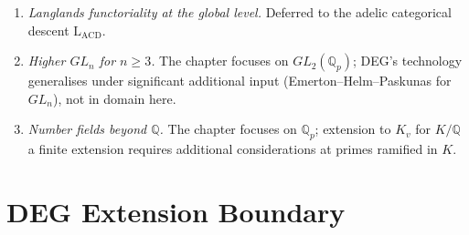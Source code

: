 \begin{enumerate}
\item \emph{Langlands functoriality at the global level.} Deferred to
the adelic categorical descent \(\mathrm{L}_{\mathrm{ACD}}\).
\item \emph{Higher \(GL_{n}\) for \(n\geq 3\).} The chapter focuses on
\(GL_{2}(\mathbb{Q}_{p})\); DEG's technology generalises under
significant additional input (Emerton--Helm--Paskunas for
\(GL_{n}\)), not in domain here.
\item \emph{Number fields beyond \(\mathbb{Q}\).} The chapter focuses
on \(\mathbb{Q}_{p}\); extension to \(K_{v}\) for \(K/\mathbb{Q}\) a
finite extension requires additional considerations at primes
ramified in \(K\).
\end{enumerate}

\section{DEG Extension Boundary}
\label{v4-arith:deg-f1a:summary}

